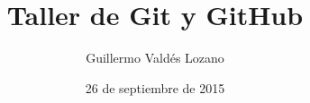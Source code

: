\documentclass{beamer}
\title{Taller de Git y GitHub}
\author{Guillermo Valdés Lozano}
\date{26 de septiembre de 2015}
\begin{document}
  \frame{\titlepage}
  
  
  
  
  
\end{document}
